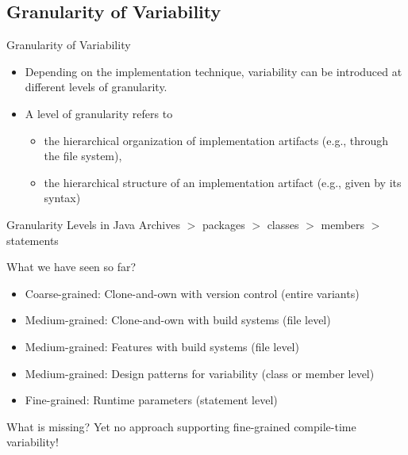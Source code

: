 
\subsection{Granularity of Variability}
\begin{frame}{\myframetitle}
	\begin{mycolumns}[animation=none]
		\begin{definition}{Granularity of Variability}
			\begin{itemize}
				\item Depending on the implementation technique, variability can be introduced at different levels of granularity.
				\item A level of granularity refers to
				\begin{itemize}
					\item the hierarchical organization of implementation artifacts (e.g., through the file system),
					\item the hierarchical structure of an implementation artifact (e.g., given by its syntax)
				\end{itemize}
			\end{itemize}
		\end{definition}
		\begin{example}{Granularity Levels in Java}
			Archives $>$ packages $>$ classes $>$ members $>$ statements
		\end{example}
		\pause
	\mynextcolumn
		\begin{note}{What we have seen so far?}
			\begin{itemize}
				\item Coarse-grained: Clone-and-own with version control (entire variants)
				\item Medium-grained: Clone-and-own with build systems (file level)
				\item Medium-grained: Features with build systems (file level)
				\item Medium-grained: Design patterns for variability (class or member level)
				\item Fine-grained: Runtime parameters (statement level) 
			\end{itemize}
		\end{note}
		\pause
		\begin{note}{What is missing?}
			Yet no approach supporting fine-grained compile-time variability!
		\end{note}		
	\end{mycolumns}
\end{frame}

